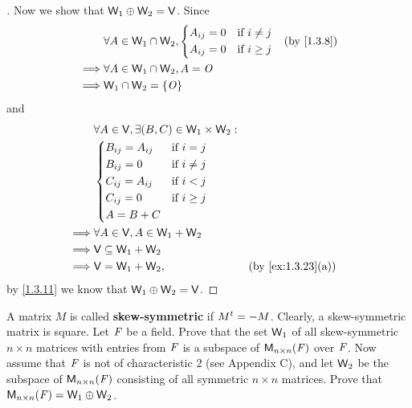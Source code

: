 \begin{proof}[]
	Now we show that \(\mathsf{W}_1 \oplus \mathsf{W}_2 = \mathsf{V}\).
	Since
	\begin{align*}
		         & \forall A \in \W_1 \cap \W_2, \begin{dcases}
			                                         A_{i j} = 0 & \text{if } i \neq j \\
			                                         A_{i j} = 0 & \text{if } i \geq j
		                                         \end{dcases} &  & \by{1.3.8} \\
		\implies & \forall A \in \W_1 \cap \W_2, A = \zm                           \\
		\implies & \W_1 \cap \W_2 = \set{\zm}
	\end{align*}
	and
	\begin{align*}
		         & \forall A \in \V, \exists (B, C) \in \W_1 \times \W_2 :                        \\
		         & \begin{dcases}
			           B_{i j} = A_{i j} & \text{if } i = j    \\
			           B_{i j} = 0       & \text{if } i \neq j \\
			           C_{i j} = A_{i j} & \text{if } i < j    \\
			           C_{i j} = 0       & \text{if } i \geq j \\
			           A = B + C
		           \end{dcases}                                        \\
		\implies & \forall A \in \V, A \in \W_1 + \W_2                                            \\
		\implies & \V \subseteq \W_1 + \W_2                                                       \\
		\implies & \V = \W_1 + \W_2,                                       &  & \by{ex:1.3.23}[a]
	\end{align*}
	by \cref{1.3.11} we know that \(\mathsf{W}_1 \oplus \mathsf{W}_2 = \mathsf{V}\).
\end{proof}

\begin{ex}\label{ex:1.3.28}
	A matrix \(M\) is called \textbf{skew-symmetric} if \({M}^{t} = -M\).
	Clearly, a skew-symmetric matrix is square.
	Let \(\mathit{F}\) be a field.
	Prove that the set \(\mathsf{W}_1\) of all skew-symmetric \(n \times n\) matrices with entries from \(\mathit{F}\) is a subspace of \(\ms[n][n][\F]\) over \(\mathit{F}\).
	Now assume that \(\mathit{F}\) is not of characteristic \(2\) (see Appendix C), and let \(\mathsf{W}_2\) be the subspace of \(\ms[n][n][\F]\) consisting of all symmetric \(n \times n\) matrices.
	Prove that \(\ms[n][n][\F] = \W_1 \oplus \W_2\).
\end{ex}

